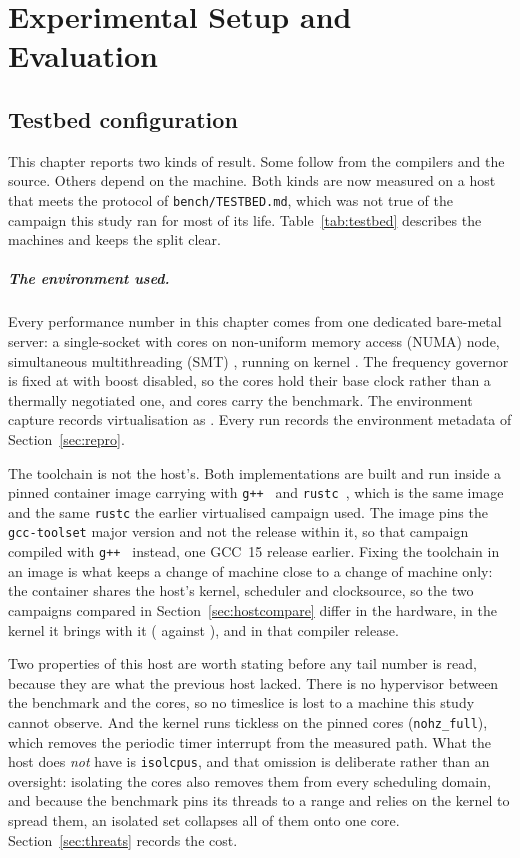 \documentclass[english,oneside,a4paper,censored,csm,software-track-2020]{HYthesisML}
\begin{document}
\chapter{Experimental Setup and Evaluation\label{chapter:eval}}

\section{Testbed configuration\label{sec:testbed}}
This chapter reports two kinds of result. Some follow from the compilers and the source. Others
depend on the machine. Both kinds are now measured on a host that meets the protocol of
\texttt{bench/TESTBED.md}, which was not true of the campaign this study ran for most of its
life. Table~\ref{tab:testbed} describes the machines and keeps the split clear.

\paragraph{The environment used.}
Every performance number in this chapter comes from one dedicated bare-metal server: a
single-socket \MainCpu{} with \MainCores{} cores on \MainNumaNodes{} non-uniform memory access
(NUMA) node, simultaneous multithreading (SMT) \MainSmt{}, running \MainHostDistro{} on kernel
\MainKernel{}. The frequency governor is fixed at
\MainGovernor{} with boost disabled, so the cores hold their base clock rather than a thermally
negotiated one, and cores \MainPinned{} carry the benchmark. The environment capture records
virtualisation as \MainVirt{}. Every run records the environment metadata of
Section~\ref{sec:repro}.

The toolchain is not the host's. Both implementations are built and run inside a pinned container
image carrying \MainDistro{} with \texttt{g++~\MainGpp} and \texttt{rustc~\MainRustc}, which is the
same image and the same \texttt{rustc} the earlier virtualised campaign used. The image pins the
\texttt{gcc-toolset} major version and not the release within it, so that campaign compiled with
\texttt{g++~\GuestGpp} instead, one GCC~15 release earlier. Fixing the toolchain in an image is
what keeps a change of machine close to a change of machine only: the container shares the host's
kernel, scheduler and clocksource, so the two campaigns compared in
Section~\ref{sec:hostcompare} differ in the hardware, in the kernel it brings with it
(\MainKernel{} against \GuestKernel{}), and in that compiler release.

Two properties of this host are worth stating before any tail number is read, because they are what
the previous host lacked. There is no hypervisor between the benchmark and the cores, so no
timeslice is lost to a machine this study cannot observe. And the kernel runs tickless on the
pinned cores (\texttt{nohz\_full}), which removes the periodic timer interrupt from the measured
path. What the host does \emph{not} have is \texttt{isolcpus}, and that omission is deliberate
rather than an oversight: isolating the cores also removes them from every scheduling domain, and
because the benchmark pins its threads to a range and relies on the kernel to spread them, an
isolated set collapses all of them onto one core. Section~\ref{sec:threats} records the cost.
\end{document}
